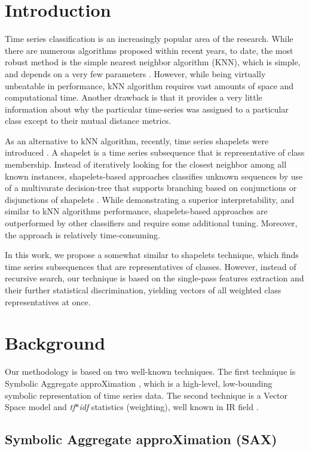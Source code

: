 \documentclass{llncs}
\begin{document}
\section{Introduction}
%
Time series classification is an increasingly popular area of the research.
While there are numerous algorithms proposed within recent years, to date,
the most robust method is the simple nearest neighbor algorithm (KNN), 
which is simple, and depends on a very few parameters \cite{ed}. 
However, while being virtually unbeatable in performance, kNN algorithm 
requires vast amounts of space and computational time. 
Another drawback is that it provides a very little information about why 
the particular time-series was assigned to a particular class except to 
their mutual distance metrics.

As an alternative to kNN algorithm, recently, time series shapelets were
introduced \cite{shapelet}. A shapelet is a time series subsequence that 
is representative of class membership.
Instead of iteratively looking for the closest neighbor
among all known instances, shapelets-based approaches classifies unknown 
sequences by use of a multivarate decision-tree that supports branching
based on conjunctions or disjunctions of shapelets \cite{logical}. 
While demonstrating a superior interpretability, and similar to kNN algorithms 
performance, shapelets-based approaches are outperformed by other classifiers
and require some additional tuning. Moreover, the approach is relatively
time-consuming.

In this work, we propose a somewhat similar to shapelets technique,
which finds time series subsequences that are representatives of classes.
However, instead of recursive search, our technique is based on the 
single-pass features extraction and their further statistical discrimination,
yielding vectors of all weighted class representatives at once.

\section{Background}
Our methodology is based on two well-known techniques. The first technique is Symbolic
Aggregate approXimation \cite{sax}, which is a high-level, low-bounding symbolic 
representation of time series data. The second technique is a Vector Space model and
\textit{tf$\ast$idf} statistics (weighting), well known in IR field \cite{tfidf}.

\subsection{Symbolic Aggregate approXimation (SAX)} \label{sax}
\end{document}
